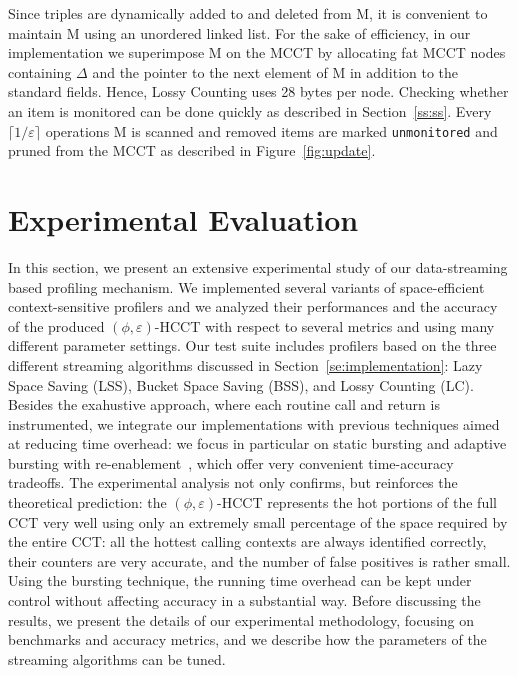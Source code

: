 \documentclass[preprint]{sigplanconf}
\begin{document}
Since triples are dynamically added to and deleted from M, it is convenient to maintain M using an unordered linked list. For the sake of efficiency, in our implementation we superimpose M on the MCCT by allocating fat MCCT nodes containing $\Delta$ and the pointer to the next element of M in addition to the standard fields. Hence, Lossy Counting uses 28 bytes per node. Checking whether an item is monitored can be done quickly as described in Section~\ref{ss:ss}. Every $\lceil 1/\varepsilon\rceil$ operations M is scanned and removed items are marked {\tt unmonitored} and pruned from the MCCT as described in Figure~\ref{fig:update}.


\section{Experimental Evaluation}
\label{se:results}

In this section, we present an extensive experimental study of our data-streaming based profiling mechanism. We implemented several variants of space-efficient context-sensitive profilers and we analyzed their performances and the accuracy of the produced $(\phi,\varepsilon)$-HCCT with respect to several metrics and using many different parameter settings. Our test suite includes profilers based on the three different streaming algorithms discussed in Section~\ref{se:implementation}: Lazy Space Saving (LSS), Bucket Space Saving (BSS), and Lossy Counting (LC). Besides the exahustive approach, where each routine call and return is instrumented, we integrate our implementations with previous techniques aimed at reducing time overhead: we focus in particular on static bursting and adaptive bursting with re-enablement~\cite{ZSCC06}, which offer very convenient time-accuracy tradeoffs. The experimental analysis not only confirms, but reinforces the theoretical prediction: the $(\phi,\varepsilon)$-HCCT represents the hot portions of the full CCT very well using only an extremely small percentage of the space required by the entire CCT: all the hottest calling contexts are always identified correctly, their counters are very accurate, and the number of false positives is rather small. Using the bursting technique, the running time overhead can be kept under control without affecting accuracy in a substantial way. Before discussing the results, we present the details of our experimental methodology, focusing on benchmarks and accuracy metrics, and we describe how the parameters of the streaming algorithms can be tuned. 
\end{document}
